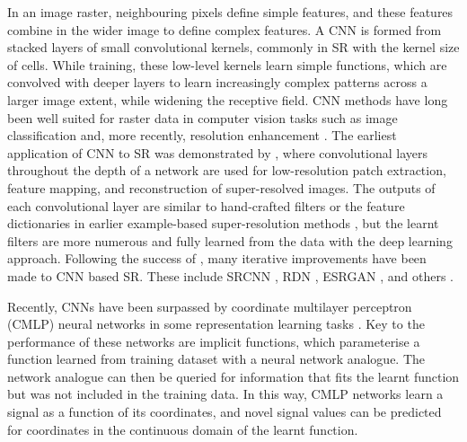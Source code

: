 \documentclass[manuscript.tex]{subfiles}
\begin{document}
In an image raster, neighbouring pixels define simple features, and these features combine in the wider image to define complex features.
A CNN is formed from stacked layers of small convolutional kernels, commonly in SR with the kernel size of  cells.
While training, these low-level kernels learn simple functions, which are convolved with deeper layers to learn increasingly complex patterns across a larger image extent, while widening the receptive field.
CNN methods have long been well suited for raster data in computer vision tasks such as image classification \parencite[e.g.][]{simonyanVeryDeepConvolutional2015} and, more recently, resolution enhancement \parencite[e.g.][]{zhangResidualDenseNetwork2018}.
The earliest application of CNN to SR was demonstrated by \textcite{dongLearningDeepConvolutional2014}, where convolutional layers throughout the depth of a network are used for low-resolution patch extraction, feature mapping, and reconstruction of super-resolved images.
The outputs of each convolutional layer are similar to hand-crafted filters or the feature dictionaries in earlier example-based super-resolution methods \parencite{freemanExamplebasedSuperresolution2002}, but the learnt filters are more numerous and fully learned from the data with the deep learning approach.
Following the success of \parencite{dongLearningDeepConvolutional2014}, many iterative improvements have been made to CNN based SR\@.
These include SRCNN \parencite{dongImageSuperresolutionUsing2016}, RDN \parencite{zhangResidualDenseNetwork2018}, ESRGAN \parencite{wangESRGANEnhancedSuperresolution2018}, and others \parencite{ledigPhotorealisticSingleImage2017,limEnhancedDeepResidual2017}.

Recently, CNNs have been surpassed by coordinate multilayer perceptron (CMLP) neural networks in some representation learning tasks \parencite[e.g.][]{chenLearningContinuousImage2021}.
Key to the performance of these networks are implicit functions, which parameterise a function learned from training dataset with a neural network analogue.
The network analogue can then be queried for information that fits the learnt function but was not included in the training data.
In this way, CMLP networks learn a signal as a function of its coordinates, and novel signal values can be predicted for coordinates in the continuous domain of the learnt function.
\end{document}
